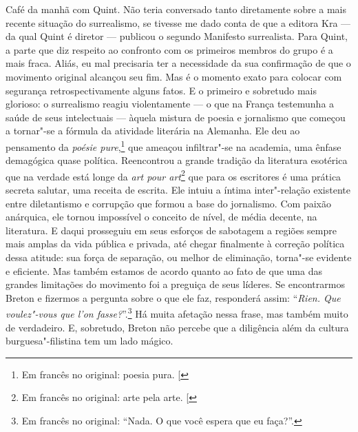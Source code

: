 Café da manhã com Quint. Não teria conversado
tanto diretamente sobre a mais recente situação do surrealismo, se
tivesse me dado conta de que a editora Kra --- da qual Quint é diretor ---
publicou o segundo Manifesto surrealista. Para Quint, a parte que diz
respeito ao confronto com os primeiros membros do grupo é a mais fraca.
Aliás, eu mal precisaria ter a necessidade da sua confirmação de que o
movimento original alcançou seu fim. Mas é o momento exato para colocar
com segurança retrospectivamente alguns fatos. E o primeiro e sobretudo
mais glorioso: o surrealismo reagiu violentamente --- o que na França
testemunha a saúde de seus intelectuais --- àquela mistura de poesia e
jornalismo que começou a tornar"-se a fórmula da atividade literária na
Alemanha. Ele deu ao pensamento da \emph{poésie pure},\footnote{Em francês no original: poesia pura. {[}\versal{N.~T.}{]}} que ameaçou
infiltrar"-se na academia, uma ênfase demagógica quase política.
Reencontrou a grande tradição da literatura esotérica que na verdade
está longe da \emph{art pour art}\footnote{Em francês no original: arte pela arte. {[}\versal{N.~T.}{]}} que para os escritores é uma prática
secreta salutar, uma receita de escrita. Ele intuiu a íntima
inter"-relação existente entre diletantismo e corrupção que formou a base
do jornalismo. Com paixão anárquica, ele tornou impossível o conceito de
nível, de média decente, na literatura. E daqui prosseguiu em seus
esforços de sabotagem a regiões sempre mais amplas da vida pública e
privada, até chegar finalmente à correção política dessa atitude: sua força de
separação, ou melhor de eliminação, torna"-se evidente e eficiente. Mas
também estamos de acordo quanto ao fato de que uma das grandes
limitações do movimento foi a preguiça de seus líderes. Se encontrarmos
Breton e fizermos a pergunta sobre o que ele faz, responderá assim: ``\emph{Rien.
Que voulez"-vous que l'on fasse?}''.\footnote{Em francês no original: ``Nada. O que você espera que eu faça?''. \versal{[N.~T.]}} Há muita afetação nessa frase, mas
também muito de verdadeiro. E, sobretudo, Breton não percebe que a diligência além da cultura burguesa"-filistina tem um lado mágico. 

